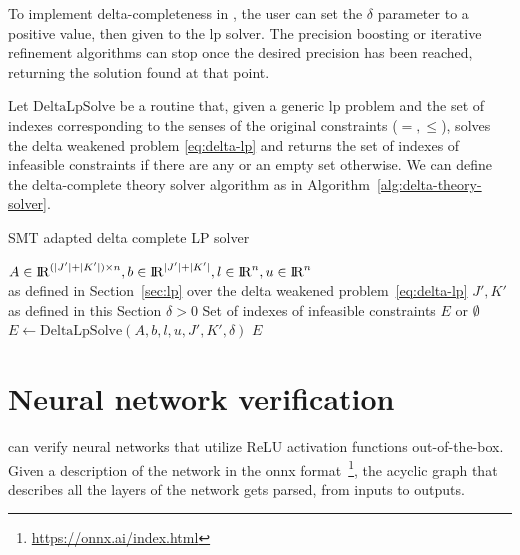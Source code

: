 \documentclass[runningheads]{llncs}
\begin{document}
To implement delta-completeness in \dlinear, the user can set the $\delta$ parameter to a positive value, then given to the \gls{lp} solver.
The precision boosting or iterative refinement algorithms can stop once the desired precision has been reached, returning the solution found at that point.

Let $\text{DeltaLpSolve}$ be a routine that, given a generic \gls{lp} problem and the set of indexes corresponding to the senses of the original constraints ($=, \le$), solves the delta weakened problem \eqref{eq:delta-lp} and returns the set of indexes of infeasible constraints if there are any or an empty set otherwise.
We can define the delta-complete theory solver algorithm as in Algorithm~\ref{alg:delta-theory-solver}.

\begin{algorithm}
    \caption{SMT adapted delta complete LP solver}\label{alg:delta-theory-solver}
    \begin{algorithmic}
        \Require $A \in {\rm I\!R}^{(|J'| + |K'|) \times n}, b \in {\rm I\!R}^{|J'| + |K'|}, l \in {\rm I\!R}^n, u \in {\rm I\!R}^n$ \\
        \qquad as defined in Section~\ref{sec:lp} over the delta weakened problem~\eqref{eq:delta-lp}
        \Require $J', K'$ as defined in this Section
        \Require $\delta > 0$
        \Ensure Set of indexes of infeasible constraints $E$ or $\emptyset$
        \State $E \gets \text{DeltaLpSolve}(A, b, l, u, J', K', \delta)$ 
        \State \Return $E$
    \end{algorithmic}
\end{algorithm}


\section{Neural network verification}
\label{sec:nn-verification}

\dlinear can verify neural networks that utilize ReLU activation functions out-of-the-box.
Given a description of the network in the \gls{onnx} format~\footnote{\url{https://onnx.ai/index.html}}, the acyclic graph that describes all the layers of the network gets parsed, from inputs to outputs.

\end{document}
